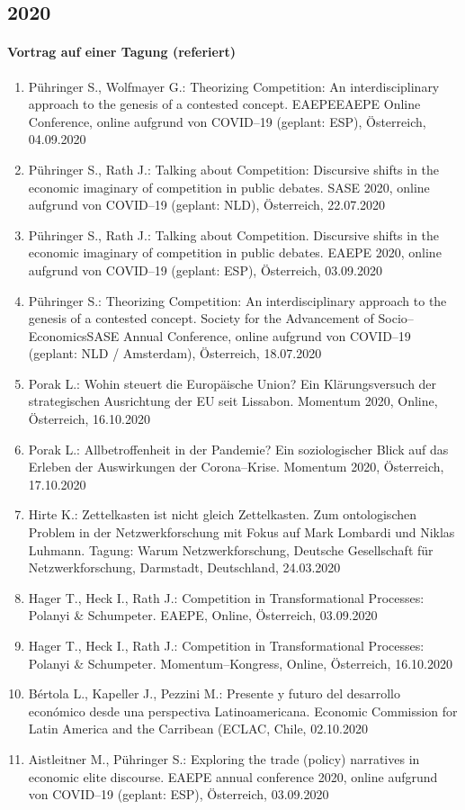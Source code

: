 \subsection*{2020}
\paragraph{Vortrag auf einer Tagung (referiert)}
\begin{enumerate}
	\item Pühringer S., Wolfmayer G.: Theorizing Competition: An interdisciplinary approach to the genesis of a contested concept. EAEPEEAEPE Online Conference, online aufgrund von COVID--19 (geplant: ESP), Österreich, 04.09.2020
	\item Pühringer S., Rath J.: Talking about Competition: Discursive shifts in the economic imaginary of competition in public debates. SASE 2020, online aufgrund von COVID--19 (geplant: NLD), Österreich, 22.07.2020
	\item Pühringer S., Rath J.: Talking about Competition. Discursive shifts in the economic imaginary of competition in public debates. EAEPE 2020, online aufgrund von COVID--19 (geplant: ESP), Österreich, 03.09.2020
	\item Pühringer S.: Theorizing Competition: An interdisciplinary approach to the genesis of a contested concept. Society for the Advancement of Socio--EconomicsSASE Annual Conference, online aufgrund von COVID--19 (geplant: NLD / Amsterdam), Österreich, 18.07.2020
	\item Porak L.: Wohin steuert die Europäische Union? Ein Klärungsversuch der strategischen Ausrichtung der EU seit Lissabon. Momentum 2020, Online, Österreich, 16.10.2020
	\item Porak L.: Allbetroffenheit in der Pandemie? Ein soziologischer Blick auf das Erleben der Auswirkungen der Corona--Krise. Momentum 2020, Österreich, 17.10.2020
	\item Hirte K.: Zettelkasten ist nicht gleich Zettelkasten. Zum ontologischen Problem in der Netzwerkforschung mit Fokus auf Mark Lombardi und Niklas Luhmann. Tagung: Warum Netzwerkforschung, Deutsche Gesellschaft für Netzwerkforschung, Darmstadt, Deutschland, 24.03.2020
	\item Hager T., Heck I., Rath J.: Competition in Transformational Processes: Polanyi \& Schumpeter. EAEPE, Online, Österreich, 03.09.2020
	\item Hager T., Heck I., Rath J.: Competition in Transformational Processes: Polanyi \& Schumpeter. Momentum--Kongress, Online, Österreich, 16.10.2020
	\item Bértola L., Kapeller J., Pezzini M.: Presente y futuro del desarrollo económico desde una perspectiva Latinoamericana. Economic Commission for Latin America and the Carribean (ECLAC, Chile, 02.10.2020
	\item Aistleitner M., Pühringer S.: Exploring the trade (policy) narratives in economic elite discourse. EAEPE annual conference 2020, online aufgrund von COVID--19 (geplant: ESP), Österreich, 03.09.2020
\end{enumerate}
